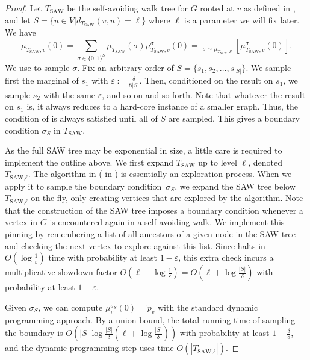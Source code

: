 \documentclass{theoretics}
\newcommand{\Ex}{\mathop{\mathbb{{}E}}\nolimits}
\newcommand{\abs}[1]{\ensuremath{\left\vert#1\right\vert}}
\newcommand{\eps}{\varepsilon}
\newcommand{\defeq}{:=}
\newcommand{\TSAW}{T_{\mathrm{SAW}}}
\begin{document}
\begin{proof}
Let $\TSAW$ be the self-avoiding walk tree for $G$ rooted at $v$ as defined in , and let $S=\{u\in V|d_{\TSAW}(v,u)=\ell\}$ where $\ell$ is a parameter we will fix later. We have
\[\mu_{\TSAW,v}(0)=\sum_{\sigma\in\{0,1\}^S}\mu_{\TSAW}(\sigma)\mu_{\TSAW,v}^\sigma(0)=\Ex_{\sigma\sim\mu_{\TSAW,S}}[\mu_{\TSAW,v}^\sigma(0)].\]
We use  to sample $\sigma$.
Fix an arbitrary order of $S=\{s_1,s_2,\ldots,s_{\abs{S}}\}$.
We sample first the marginal of $s_1$ with $\eps\defeq\frac{\delta}{8\abs{S}}$.
Then, conditioned on the result on $s_1$, we sample $s_2$ with the same $\eps$, and so on and so forth.
Note that whatever the result on $s_1$ is, it always reduces to a hard-core instance of a smaller graph.
Thus, the condition of  is always satisfied until all of $S$ are sampled.
This gives a boundary condition $\sigma_S$ in $\TSAW$.

As the full SAW tree may be exponential in size,
a little care is required to implement the outline above.
We first expand $\TSAW$ up to level $\ell$, denoted $T_\textrm{SAW,$\ell$}$. %
The algorithm in  ( in ) is essentially an exploration process.
When we apply it to sample the boundary condition~$\sigma_S$,
we expand the SAW tree below $T_\textrm{SAW,$\ell$}$ on the fly,
only creating vertices that are explored by the algorithm.
Note that the construction of the SAW tree imposes a boundary condition whenever a vertex in $G$ is encountered again in a self-avoiding walk.
We implement this pinning by remembering a list of all ancestors of a given node in the SAW tree and checking the next vertex to explore against this list.
Since  halts in $O(\log\frac{1}{\eps})$ time with probability at least $1-\eps$,
this extra check incurs a multiplicative slowdown factor $O(\ell+\log\frac{1}{\eps})=O(\ell+\log\frac{\abs{S}}{\delta})$ with probability at least $1-\eps$. 

Given $\sigma_S$, we can compute $\mu_v^{\sigma_S}(0)=\widetilde{p}_v$ with the standard dynamic programming approach.
By a union bound, the total running time of sampling the boundary is $O(\abs{S}\log\frac{\abs{S}}{\delta}(\ell+\log\frac{\abs{S}}{\delta}))$ with probability at least $1-\frac{\delta}{8}$,
  and the dynamic programming step uses time $O(\abs{T_\textrm{SAW,$\ell$}})$.


\end{proof}
\end{document}
